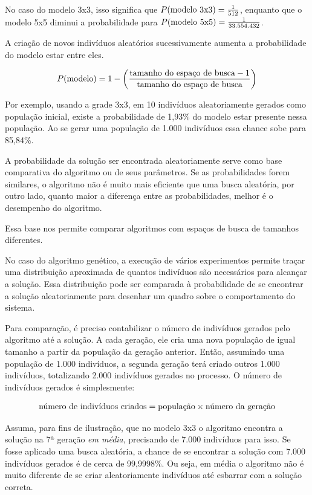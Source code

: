 \documentclass{llncs}
\begin{document}
No caso do modelo 3x3, isso significa que $P(\textnormal{modelo 3x3}) = \frac{1}{512}$, enquanto que o modelo 5x5 diminui a probabilidade para $P(\textnormal{modelo 5x5}) = \frac{1}{33.554.432}$.

A criação de novos indivíduos aleatórios sucessivamente aumenta a probabilidade do modelo estar entre eles.

\begin{align*}
P(\textnormal{modelo}) = 1 - \left(\frac{\textnormal{tamanho do espaço de busca} - 1}{\textnormal{tamanho do espaço de busca} }\right)^{\textnormal{}} 
\end{align*}

Por exemplo, usando a grade 3x3, em 10 indivíduos aleatoriamente gerados como população inicial, existe a probabilidade de 1,93\% do modelo estar presente nessa população. Ao se gerar uma população de 1.000 indivíduos essa chance sobe para 85,84\%.

A probabilidade da solução ser encontrada aleatoriamente serve como base comparativa do algoritmo ou de seus parâmetros. Se as probabilidades forem similares, o algoritmo não é muito mais eficiente que uma busca aleatória, por outro lado, quanto maior a diferença entre as probabilidades, melhor é o desempenho do algoritmo.

Essa base nos permite comparar algoritmos com espaços de busca de tamanhos diferentes.

No caso do algoritmo genético, a execução de vários experimentos permite traçar uma distribuição aproximada de quantos indivíduos são necessários para alcançar a solução. Essa distribuição pode ser comparada à probabilidade de se encontrar a solução aleatoriamente para desenhar um quadro sobre o comportamento do sistema.

Para comparação, é preciso contabilizar o número de indivíduos gerados pelo algoritmo até a solução. A cada geração, ele cria uma nova população de igual tamanho a partir da população da geração anterior. Então, assumindo uma população de 1.000 indivíduos, a segunda geração terá criado outros 1.000 indivíduos, totalizando 2.000 indivíduos gerados no processo. O número de indivíduos gerados é simplesmente:

\begin{align*}
\textnormal{número de indivíduos criados} = \textnormal{população} \times \textnormal{número da geração}
\end{align*}

Assuma, para fins de ilustração, que no modelo 3x3 o algoritmo encontra a solução na 7ª geração \emph{em média}, precisando de 7.000 indivíduos para isso. Se fosse aplicado uma busca aleatória, a chance de se encontrar a solução com 7.000 indivíduos gerados é de cerca de 99,9998\%. Ou seja, em média o algoritmo não é muito diferente de se criar aleatoriamente indivíduos até esbarrar com a solução correta.
\end{document}
